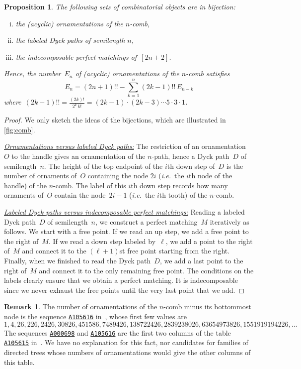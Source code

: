 \documentclass{amsart}
\newtheorem{proposition}[theorem]{Proposition}
\theoremstyle{definition}
\newtheorem{remark}[theorem]{Remark}
\newcommand{\ie}{\textit{i.e.}~} %
\newcommand{\OEIS}[1]{{\rm \href{http://oeis.org/#1}{\texttt{#1}}}}
\begin{document}
\begin{proposition}
\label{prop:comb}
The following sets of combinatorial objects are in bijection:
\begin{enumerate}[(i)]
\item the (acyclic) ornamentations of the $n$-comb,
\item the labeled Dyck paths of semilength $n$,
\item the indecomposable perfect matchings of~$[2n+2]$.
\end{enumerate}
Hence, the number~$E_n$ of (acyclic) ornamentations of the $n$-comb satisfies
\[
E_n = (2n+1)!! - \sum_{k = 1}^n (2k-1)!! \, E_{n-k}
\]
where~$\displaystyle(2k-1)!! = \frac{(2k)!}{2^k \, k!} = (2k-1) \cdot (2k-3) \cdots 5 \cdot 3 \cdot 1$.
\end{proposition}

\begin{proof}
We only sketch the ideas of the bijections, which are illustrated in \cref{fig:comb}.

\medskip\noindent
\uline{\textsl{Ornamentations versus labeled Dyck paths:}}
The restriction of an ornamentation~$O$ to the handle gives an ornamentation of the $n$-path, hence a Dyck path~$D$ of semilength~$n$.
The height of the top endpoint of the $i$th down step of~$D$ is the number of ornaments of~$O$ containing the node $2i$ (\ie the $i$th node of the handle) of the $n$-comb.
The label of this $i$th down step records how many ornaments of~$O$ contain the node~$2i-1$ (\ie the $i$th tooth) of the $n$-comb.

\medskip\noindent
\uline{\textsl{Labeled Dyck paths versus indecomposable perfect matchings:}}
Reading a labeled Dyck path~$D$ of semilength~$n$, we construct a perfect matching~$M$ iteratively as follows.
We start with a free point.
If we read an up step, we add a free point to the right of~$M$.
If we read a down step labeled by~$\ell$, we add a point to the right of~$M$ and connect it to the $(\ell+1)$st free point starting from the right.
Finally, when we finished to read the Dyck path~$D$, we add a last point to the right of~$M$ and connect it to the only remaining free point.
The conditions on the labels clearly ensure that we obtain a perfect matching.
It is indecomposable since we never exhaust the free points until the very last point that we add.
\end{proof}

\begin{remark}
The number of ornamentations of the $n$-comb minus its bottommost node is the sequence \OEIS{A105616} in~\cite{OEIS}, whose first few values are
\[
1, 4, 26, 226, 2426, 30826, 451586, 7489426, 138722426, 2839238026, 63654973826, 1551919194226, \dots %
\]
The sequences \OEIS{A000698} and \OEIS{A105616} are the first two columns of the table \OEIS{A105615} in~\cite{OEIS}.
We have no explanation for this fact, nor candidates for families of directed trees whose numbers of ornamentations would give the other columns of this table.
\end{remark}
\end{document}
